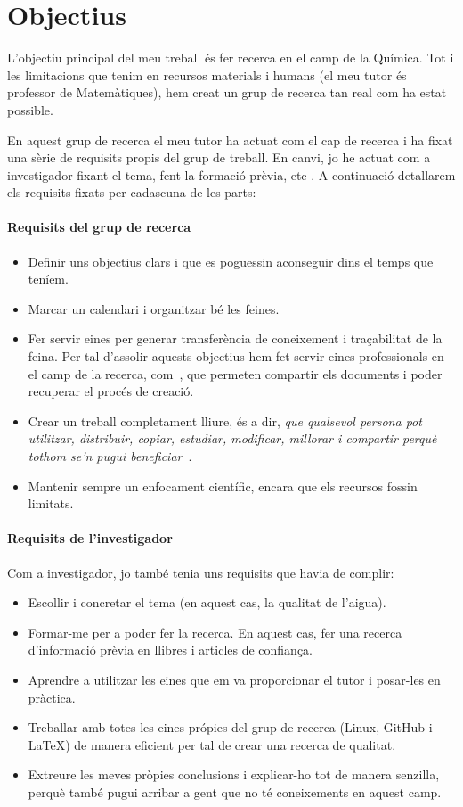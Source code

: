 \chapter{Objectius}
\label{c:objectius}
L'objectiu principal del meu treball és fer recerca en el camp de la Química. Tot i les limitacions que tenim en recursos materials i humans (el meu tutor és professor de Matemàtiques), hem creat un grup de recerca tan real com ha estat possible.

En aquest grup de recerca el meu tutor ha actuat com el cap de recerca i ha fixat una sèrie de requisits propis del grup de treball. En canvi, jo he actuat com a investigador fixant el tema, fent la formació prèvia, etc .
A continuació detallarem els requisits fixats per cadascuna de les parts:

\subsubsection*{Requisits del grup de recerca}
\begin{itemize}
    \item Definir uns objectius clars i que es poguessin aconseguir dins el temps que teníem.
    \item Marcar un calendari i organitzar bé les feines.
    \item Fer servir eines per generar transferència de coneixement i traçabilitat de la feina. Per tal d'assolir aquests objectius hem fet servir eines professionals en el camp de la recerca, com~, que permeten compartir els documents i poder recuperar el procés de creació.
    \item Crear un treball completament lliure, és a dir, \textit{que qualsevol persona pot utilitzar, distribuir, copiar, estudiar, modificar, millorar i compartir perquè tothom se'n pugui beneficiar}~\cite{programariLliure}.
    \item Mantenir sempre un enfocament científic, encara que els recursos fossin limitats.
\end{itemize}

\subsubsection*{Requisits de l'investigador}
Com a investigador, jo també tenia uns requisits que havia de complir:
\begin{itemize}
    \item Escollir i concretar el tema (en aquest cas, la qualitat de l’aigua).
    \item Formar-me per a poder fer la recerca. En aquest cas, fer una recerca d'informació prèvia en llibres i articles de confiança.
    \item Aprendre a utilitzar les eines que em va proporcionar el tutor i posar-les en pràctica.
    \item Treballar amb totes les eines própies del grup de recerca (Linux, GitHub i LaTeX) de manera eficient per tal de crear una recerca de qualitat.
    \item Extreure les meves pròpies conclusions i explicar-ho tot de manera senzilla, perquè també pugui arribar a gent que no té coneixements en aquest camp.
\end{itemize}

